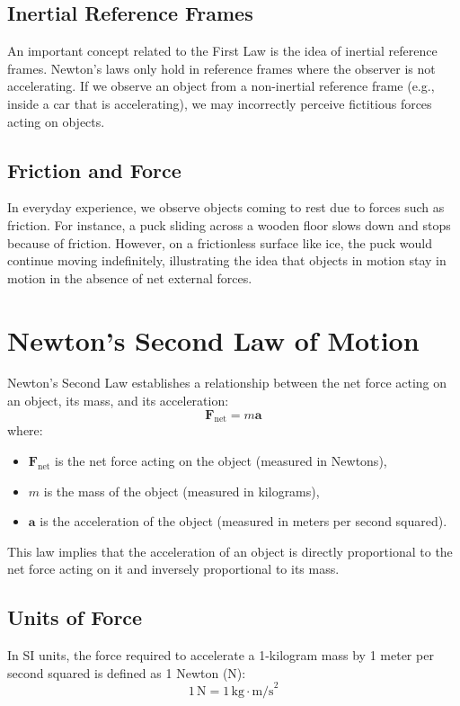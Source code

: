 \documentclass{article}
\begin{document}
\subsection*{Inertial Reference Frames}
An important concept related to the First Law is the idea of inertial reference frames. Newton's laws only hold in reference frames where the observer is not accelerating. If we observe an object from a non-inertial reference frame (e.g., inside a car that is accelerating), we may incorrectly perceive fictitious forces acting on objects.

\subsection*{Friction and Force}
In everyday experience, we observe objects coming to rest due to forces such as friction. For instance, a puck sliding across a wooden floor slows down and stops because of friction. However, on a frictionless surface like ice, the puck would continue moving indefinitely, illustrating the idea that objects in motion stay in motion in the absence of net external forces.

\section*{Newton's Second Law of Motion}
Newton’s Second Law establishes a relationship between the net force acting on an object, its mass, and its acceleration:
\begin{equation}
    \mathbf{F}_{\text{net}} = m \mathbf{a}
\end{equation}
where:
\begin{itemize}
    \item $\mathbf{F}_{\text{net}}$ is the net force acting on the object (measured in Newtons),
    \item $m$ is the mass of the object (measured in kilograms),
    \item $\mathbf{a}$ is the acceleration of the object (measured in meters per second squared).
\end{itemize}
This law implies that the acceleration of an object is directly proportional to the net force acting on it and inversely proportional to its mass.

\subsection*{Units of Force}
In SI units, the force required to accelerate a 1-kilogram mass by 1 meter per second squared is defined as 1 Newton (N):
\begin{equation}
    1 \, \text{N} = 1 \, \text{kg} \cdot \text{m/s}^2
\end{equation}
\end{document}
